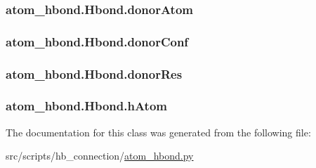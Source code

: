 \hypertarget{classatom__hbond_1_1_hbond_ad30074a37c7d9d1a7c86a1f3f1d801f9}{
\subsubsection[{donor\-Atom}]{\setlength{\rightskip}{0pt plus 5cm}atom\-\_\-hbond.\-Hbond.\-donor\-Atom}}\label{classatom__hbond_1_1_hbond_ad30074a37c7d9d1a7c86a1f3f1d801f9}
\hypertarget{classatom__hbond_1_1_hbond_a5db6b3701d1056d7fb55f891fae5795e}{
\subsubsection[{donor\-Conf}]{\setlength{\rightskip}{0pt plus 5cm}atom\-\_\-hbond.\-Hbond.\-donor\-Conf}}\label{classatom__hbond_1_1_hbond_a5db6b3701d1056d7fb55f891fae5795e}
\hypertarget{classatom__hbond_1_1_hbond_a742249524df51f1444f2e807f2666347}{
\subsubsection[{donor\-Res}]{\setlength{\rightskip}{0pt plus 5cm}atom\-\_\-hbond.\-Hbond.\-donor\-Res}}\label{classatom__hbond_1_1_hbond_a742249524df51f1444f2e807f2666347}
\hypertarget{classatom__hbond_1_1_hbond_afe82776aaf2520c71a04569bd1eb725c}{
\subsubsection[{h\-Atom}]{\setlength{\rightskip}{0pt plus 5cm}atom\-\_\-hbond.\-Hbond.\-h\-Atom}}\label{classatom__hbond_1_1_hbond_afe82776aaf2520c71a04569bd1eb725c}


The documentation for this class was generated from the following file\-:\begin{DoxyCompactItemize}
\item 
src/scripts/hb\-\_\-connection/\hyperlink{atom__hbond_8py}{atom\-\_\-hbond.\-py}\end{DoxyCompactItemize}
